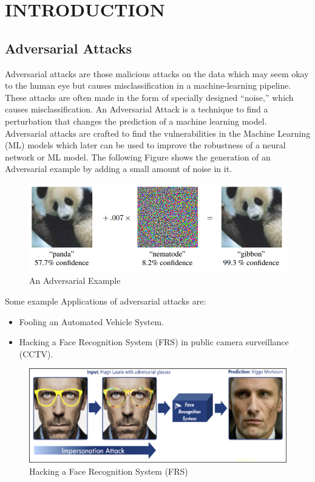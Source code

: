 \section{INTRODUCTION}


\subsection{Adversarial Attacks}
Adversarial attacks are those malicious attacks on the data which may seem okay to the human eye but causes misclassification in a machine-learning pipeline. These attacks are often made in the form of specially designed “noise,” which causes misclassification.
An Adversarial Attack is a technique to find a perturbation that changes the prediction of a machine learning model.
Adversarial attacks are crafted to find the vulnerabilities in the Machine Learning (ML) models which later can be used to improve the robustness of a neural network or ML model. The following Figure shows the generation of an Adversarial example by adding a small amount of noise in it.\\

\begin{figure}[!hbt]
    \centering
    \includegraphics[scale=0.6]{img/Picture2.png}
    \caption{An Adversarial Example}
    \label{fig:Figure1}
\end{figure}

Some example Applications of adversarial attacks are:
\begin{itemize}
  \item Fooling an Automated Vehicle System.
  \item Hacking a Face Recognition System (FRS) in public camera surveillance (CCTV).
\end{itemize}

\begin{figure}[!hbt]
    \centering
    \includegraphics[scale=0.7]{img/Picture1.png}
    \caption{Hacking a Face Recognition System (FRS)}
    \label{fig:Figure1}
\end{figure}



